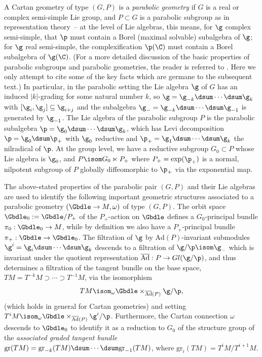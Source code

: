 A Cartan geometry of type $(G,P)$ is a \emph{parabolic geometry} if $G$ is a real or complex semi-simple Lie group, and $P \subset G$ is a parabolic subgroup as in representation theory~-- at the level of Lie algebras, this means, for $\g$ complex semi-simple, that $\p$ must contain a Borel (maximal solvable) subalgebra of $\g$; for $\g$ real semi-simple, the complexif\/ication $\p(\C)$ must contain a Borel subalgebra of $\g(\C)$. (For a more detailed discussion of the basic properties of parabolic subgroups and parabolic geometries, the reader is referred to \cite{CSbook}. Here we only attempt to cite some of the key facts which are germane to the subsequent text.) In particular, in the parabolic setting the Lie algebra $\g$ of $G$ has an induced $\vert k \vert$-grading for some natural number $k$, so $\g = \g_{-k} \dsum \cdots \dsum \g_k$ with $[\g_i,\g_j] \subseteq \g_{i+j}$ and the subalgebra $\g_- = \g_{-k} \dsum \cdots \dsum \g_{-1}$ is generated by $\g_{-1}$. The Lie algebra of the parabolic subgroup $P$ is the parabolic subalgebra $\p = \g_0 \dsum \cdots \dsum \g_{k}$, which has Levi decomposition $\p = \g_0 \dsum \p_+$ with $\g_0$ reductive and $\p_+ = \g_1 \dsum \cdots \dsum \g_k$ the nilradical of $\p$. At the group level, we have a reductive subgroup $G_0 \subset P$ whose Lie algebra is $\g_0$, and $P \isom G_0 \ltimes P_+$ where $P_+ = \exp (\p_+)$ is a normal, nilpotent subgroup of $P$ globally dif\/feomorphic to $\p_+$ via the exponential map.

The above-stated properties of the parabolic pair $(G,P)$ and their Lie algebras are used to identify the following important geometric structures associated to a parabolic geometry $(\Gbdle \rightarrow M,\omega)$ of type $(G,P)$. The orbit space $\Gbdle_0 := \Gbdle/P_+$ of the $P_+$-action on $\Gbdle$ def\/ines a $G_0$-principal bundle $\pi_0: \Gbdle_0 \rightarrow M$, while by def\/inition we also have a $P_+$-principal bundle $\pi_+: \Gbdle \rightarrow \Gbdle_0$. The f\/iltration of $\g$ by $\mathrm{Ad}(P)$-invariant submodules $\g^i = \g_i \dsum \cdots \dsum \g_k$ descends to a f\/iltration of $\g/\p \isom \g_-$ which is invariant under the quotient representation $\overline{\mathrm{Ad}}: P \rightarrow Gl(\g/\p)$, and thus determines a f\/iltration of the tangent bundle on the base space, $TM = T^{-k}M \supset \cdots \supset T^{-1}M$, via the isomorphism
\[
TM \isom_{\omega} \Gbdle \times_{\overline{\mathrm{Ad}}(P)} \g/\p,
\]
(which holds in general for Cartan geometries) and setting $T^iM \isom_{\omega} \Gbdle \times_{\overline{\mathrm{Ad}}(P)} \g^i/\p$. Furthermore, the Cartan connection $\omega$ descends to $\Gbdle_0$ to identify it as a reduction to $G_0$ of the structure group of the \emph{associated graded tangent bundle} $\mathrm{gr}(TM) = \mathrm{gr}_{-k}(TM) \dsum \cdots \dsum \mathrm{gr}_{-1}(TM)$, where $\mathrm{gr}_i(TM) = T^iM/T^{i+1}M$.

